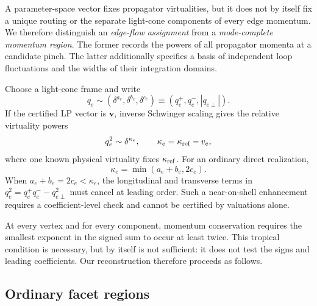 \documentclass[a4paper,11pt]{article}
\begin{document}
A parameter-space vector fixes propagator virtualities, but it does not by
itself fix a unique routing or the separate light-cone components of every
edge momentum.  We therefore distinguish an \emph{edge-flow assignment}
from a \emph{mode-complete momentum region}.  The former records the powers
of all propagator momenta at a candidate pinch.  The latter additionally
specifies a basis of independent loop fluctuations and the widths of their
integration domains.

Choose a light-cone frame and write
\begin{equation}
 q_e\sim(\delta^{a_e},\delta^{b_e},\delta^{c_e})
 \equiv(q_e^+,q_e^-,|q_{e\perp}|).
 \label{eq:edge-component-powers}
\end{equation}
If the certified LP vector is \(\boldsymbol v\), inverse Schwinger scaling
gives the relative virtuality powers
\begin{equation}
 q_e^2\sim\delta^{\kappa_e},\qquad
 \kappa_e=\kappa_{\rm ref}-v_e,
 \label{eq:inverse-schwinger-rule}
\end{equation}
where one known physical virtuality fixes \(\kappa_{\rm ref}\).  For an
ordinary direct realization,
\begin{equation}
 \kappa_e=\min(a_e+b_e,2c_e).
 \label{eq:direct-virtuality-rule}
\end{equation}
When \(a_e+b_e=2c_e<\kappa_e\), the longitudinal and transverse terms in
\(q_e^2=q_e^+q_e^- -q_{e\perp}^2\) must cancel at leading order.  Such a
near-on-shell enhancement requires a coefficient-level check and cannot be
certified by valuations alone.

At every vertex and for every component, momentum conservation requires the
smallest exponent in the signed sum to occur at least twice.  This tropical
condition is necessary, but by itself is not sufficient: it does not test
the signs and leading coefficients.  Our reconstruction therefore proceeds
as follows.

\subsection{Ordinary facet regions}
\end{document}
